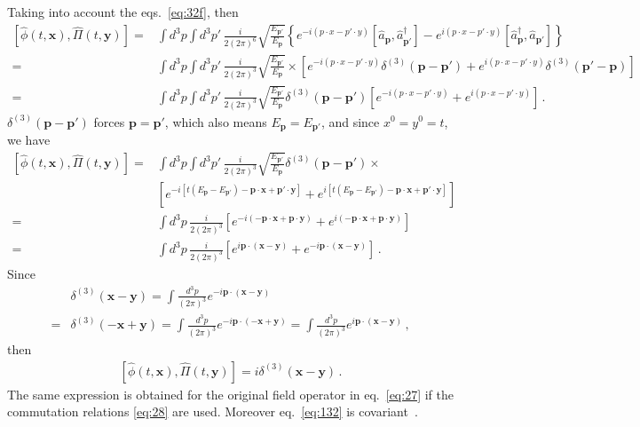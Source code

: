 Taking into account the eqs.~\eqref{eq:32f}, then
\begin{align}
  \left[\widehat{\phi}(t,\mathbf{x}),\widehat{\Pi}(t,\mathbf{y})\right]=&
\int d^3p\int d^3p'\,\frac{i}{2(2\pi)^6}\sqrt{\frac{E_{\mathbf{p}'}}{E_{\mathbf{p}}}}\left\{ 
e^{-i (p\cdot x- p'\cdot y) }\left[\widehat{a}_\mathbf{p} ,\widehat{a}_{\mathbf{p}'}^\dagger \right]
-e^{i (p\cdot x- p'\cdot y) }\left[\widehat{a}_\mathbf{p}^\dagger ,\widehat{a}_{\mathbf{p}'} \right]
\right\}\nonumber\\
=&
\int d^3p\int d^3p'\,\frac{i}{2(2\pi)^3}\sqrt{\frac{E_{\mathbf{p}'}}{E_{\mathbf{p}}}}\times\left[
e^{-i (p\cdot x- p'\cdot y) }\delta^{(3)}(\mathbf{p}-\mathbf{p}')
+e^{i (p\cdot x- p'\cdot y) }\delta^{(3)}(\mathbf{p}'-\mathbf{p}) 
\right]\nonumber\\
=&
\int d^3p\int d^3p'\,\frac{i}{2(2\pi)^3}\sqrt{\frac{E_{\mathbf{p}'}}{E_{\mathbf{p}}}}\delta^{(3)}(\mathbf{p}-\mathbf{p}')\left[
e^{-i (p\cdot x- p'\cdot y) }
+e^{i (p\cdot x- p'\cdot y) }
\right]\,.
\end{align}
$\delta^{(3)}(\mathbf{p}-\mathbf{p}')$ forces $\mathbf{p}=\mathbf{p}'$, which also means $E_{\mathbf{p}}=E_{\mathbf{p}'}$, and since $x^0=y^0=t$, we have
\begin{align}
  \left[\widehat{\phi}(t,\mathbf{x}),\widehat{\Pi}(t,\mathbf{y})\right]=&
\int d^3p\int d^3p'\,\frac{i}{2(2\pi)^3}\sqrt{\frac{E_{\mathbf{p}'}}{E_{\mathbf{p}}}}\delta^{(3)}(\mathbf{p}-\mathbf{p}')
\times\nonumber\\
&\left[
e^{-i [t(E_{\mathbf{p}}-E_{\mathbf{p}'})-\mathbf{p}\cdot \mathbf{x}+ \mathbf{p}'\cdot \mathbf{y} ] }
+e^{i[ t(E_{\mathbf{p}}-E_{\mathbf{p}'})-\mathbf{p}\cdot \mathbf{x}+ \mathbf{p}'\cdot \mathbf{y}] }
\right]\nonumber\\
=&\int d^3p\,\frac{i}{2(2\pi)^3}
\left[
e^{-i (-\mathbf{p}\cdot \mathbf{x}+ \mathbf{p}\cdot \mathbf{y} ) }
+e^{i(-\mathbf{p}\cdot \mathbf{x}+ \mathbf{p}\cdot \mathbf{y}) }
\right]\nonumber\\
=&\int d^3p\,\frac{i}{2(2\pi)^3}
\left[
e^{i \mathbf{p}\cdot( \mathbf{x}- \mathbf{y} ) }
+e^{-i\mathbf{p}\cdot( \mathbf{x}-  \mathbf{y}) }
\right]\,.
\end{align}
Since
\begin{align}
 & \delta^{(3)}(\mathbf{x}-\mathbf{y})=\int\frac{d^3p}{(2\pi)^3}e^{-i\mathbf{p}\cdot(\mathbf{x}-\mathbf{y})}\nonumber\\
=&\delta^{(3)}(-\mathbf{x}+\mathbf{y})=\int\frac{d^3p}{(2\pi)^3}e^{-i\mathbf{p}\cdot(-\mathbf{x}+\mathbf{y})}=
\int\frac{d^3p}{(2\pi)^3}e^{i\mathbf{p}\cdot(\mathbf{x}-\mathbf{y})}\,,
\end{align}
then
\begin{align}
\label{eq:132}
    \left[\widehat{\phi}(t,\mathbf{x}),\widehat{\Pi}(t,\mathbf{y})\right]=i\delta^{(3)}(\mathbf{x}-\mathbf{y})\,.
\end{align}
The same expression is obtained for the original field operator in eq.~\eqref{eq:27} if the commutation relations \eqref{eq:28} are used. Moreover eq.~\eqref{eq:132} is covariant~\cite{Lahiri:2005sm}.

